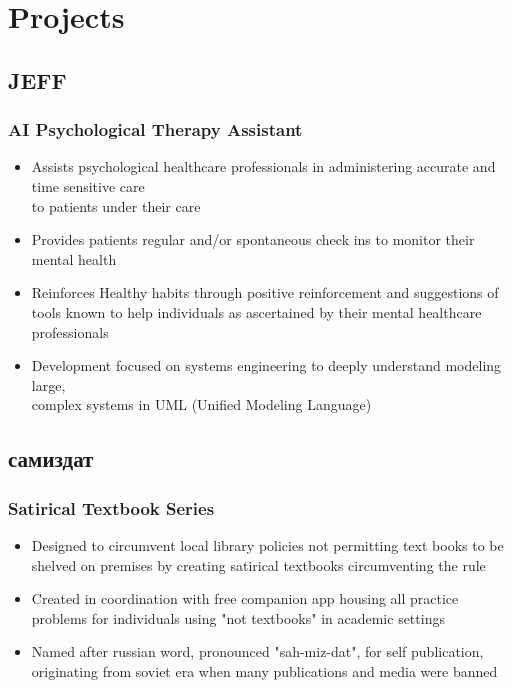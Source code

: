 \documentclass[10pt]{article} %
\begin{document}
\section{Projects}
\subsection{JEFF}
\subsubsection{AI Psychological Therapy Assistant}
\begin{itemize}
    \item {Assists psychological healthcare professionals in administering accurate
        and time sensitive care \\ to patients under their care}
    \item {Provides patients regular and/or spontaneous check ins to monitor their 
        mental health}
    \item {Reinforces Healthy habits through positive reinforcement and suggestions
        of tools known to help individuals as ascertained by their mental healthcare 
        professionals}
    \item {Development focused on systems engineering to deeply understand 
        modeling large, \\ complex systems in UML (Unified Modeling Language)}
\end{itemize}

\subsection{самиздат}
\subsubsection{Satirical Textbook Series}
\begin{itemize}
    \item {Designed to circumvent local library policies not permitting text books
        to be shelved on premises by creating satirical textbooks circumventing 
        the rule}
    \item {Created in coordination with free companion app housing all practice
        problems for individuals using "not textbooks" in academic settings}
    \item {Named after russian word, pronounced "sah-miz-dat", for self publication, 
        originating from soviet era when many publications and media were banned}
\end{itemize}
\end{document}
